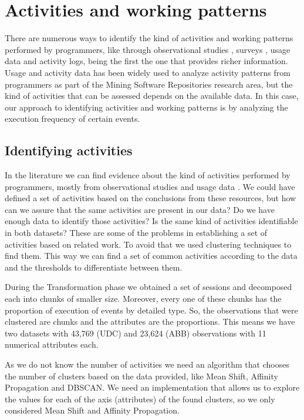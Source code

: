 \section{Activities and working patterns}
There are numerous ways to identify the kind of activities and working patterns performed by programmers, like through observational studies \cite{GM04}, surveys \cite{PR11}, usage data \cite{MPB12} and activity logs, being the first the one that provides richer information. Usage and activity data has been widely used to analyze activity patterns from programmers as part of the Mining Software Repositories research area, but the kind of activities that can be assessed depends on the available data. In this case, our approach to identifying activities and working patterns is by analyzing the execution frequency of certain events.

\subsection{Identifying activities}
In the literature we can find evidence about the kind of activities performed by programmers, mostly from observational studies and usage data \cite{LVD06,GM04, MMLK14, MKF06}. We could have defined a set of activities based on the conclusions from these resources, but how can we assure that the same activities are present in our data? Do we have enough data to identify those activities? Is the same kind of activities identifiable in both datasets? These are some of the problems in establishing a set of activities based on related work. To avoid that we used clustering techniques to find them. This way we can find a set of common activities according to the data and the thresholds to differentiate between them.

During the Transformation phase we obtained a set of sessions and decomposed each into chunks of smaller size. Moreover, every one of these chunks has the proportion of execution of events by detailed type. So, the observations that were clustered are chunks and the attributes are the proportions. This means we have two datasets with 43,769 (UDC) and 23,624 (ABB) observations with 11 numerical attributes each.

As we do not know the number of activities we need an algorithm that chooses the number of clusters based on the data provided, like Mean Shift, Affinity Propagation and DBSCAN. We need an implementation that allows us to explore the values for each of the axis (attributes) of the found clusters, so we only considered Mean Shift and Affinity Propagation.

